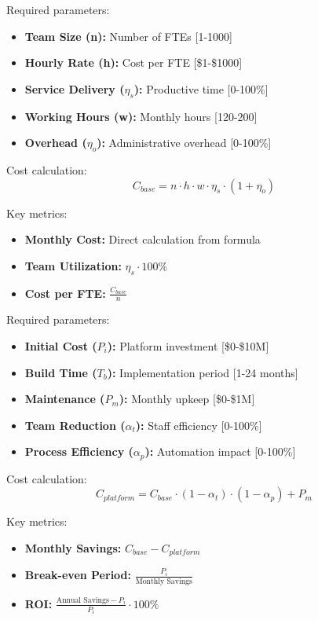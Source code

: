 \documentclass[12pt,a4paper]{article}
\newenvironment{definition}[1]
{\begin{mdframed}[style=definitionstyle,frametitle={Definition: #1}]}
{\end{mdframed}}
\begin{document}
\begin{definition}{Base Team Model Inputs}
Required parameters:
\begin{itemize}
    \item \textbf{Team Size (n):} Number of FTEs [1-1000]
    \item \textbf{Hourly Rate (h):} Cost per FTE [\$1-\$1000]
    \item \textbf{Service Delivery ($\eta_s$):} Productive time [0-100\%]
    \item \textbf{Working Hours (w):} Monthly hours [120-200]
    \item \textbf{Overhead ($\eta_o$):} Administrative overhead [0-100\%]
\end{itemize}

Cost calculation:
\begin{equation}
    C_{base} = n \cdot h \cdot w \cdot \eta_s \cdot (1 + \eta_o)
\end{equation}

Key metrics:
\begin{itemize}
    \item \textbf{Monthly Cost:} Direct calculation from formula
    \item \textbf{Team Utilization:} $\eta_s \cdot 100\%$
    \item \textbf{Cost per FTE:} $\frac{C_{base}}{n}$
\end{itemize}
\end{definition}

\begin{definition}{Team Platform Solution Inputs}
Required parameters:
\begin{itemize}
    \item \textbf{Initial Cost ($P_i$):} Platform investment [\$0-\$10M]
    \item \textbf{Build Time ($T_b$):} Implementation period [1-24 months]
    \item \textbf{Maintenance ($P_m$):} Monthly upkeep [\$0-\$1M]
    \item \textbf{Team Reduction ($\alpha_t$):} Staff efficiency [0-100\%]
    \item \textbf{Process Efficiency ($\alpha_p$):} Automation impact [0-100\%]
\end{itemize}

Cost calculation:
\begin{equation}
    C_{platform} = C_{base} \cdot (1 - \alpha_t) \cdot (1 - \alpha_p) + P_m
\end{equation}

Key metrics:
\begin{itemize}
    \item \textbf{Monthly Savings:} $C_{base} - C_{platform}$
    \item \textbf{Break-even Period:} $\frac{P_i}{\text{Monthly Savings}}$
    \item \textbf{ROI:} $\frac{\text{Annual Savings} - P_i}{P_i} \cdot 100\%$
\end{itemize}
\end{definition}
\end{document}
